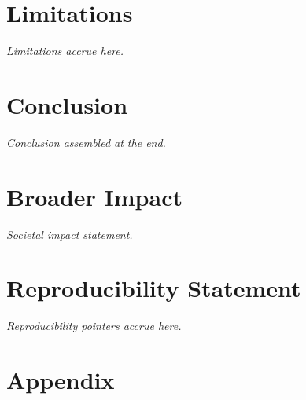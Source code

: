 \documentclass{article}
\begin{document}
\section*{Limitations}
\textit{Limitations accrue here.}

\section{Conclusion}
\textit{Conclusion assembled at the end.}

\section*{Broader Impact}
\textit{Societal impact statement.}

\section*{Reproducibility Statement}
\textit{Reproducibility pointers accrue here.}




\appendix
\section{Appendix}

% 
\end{document}
